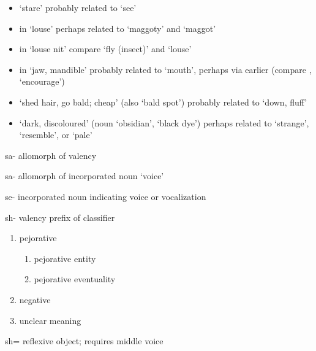 \begin{morphdesc}[resume*=alphalist]
\begin{enumerate}
\begin{itemize}
			(noun  ‘flab’)
			probably related to  ‘fat’ (noun  ‘fat’),
			compare  ‘fat (nonhuman)’,
			 ‘dog salmon’
		\item	{} ‘stare’
			probably related to  ‘see’
		\item	{} in  ‘louse’
			perhaps related to  ‘maggoty’
			and  ‘maggot’
		\item	{} in  ‘louse nit’
			compare  ‘fly (insect)’ and  ‘louse’
		\item	{} in  ‘jaw, mandible’
			probably related to  ‘mouth’, perhaps via earlier 
			(compare ,  ‘encourage’)
		\item	{} ‘shed hair, go bald; cheap’
			(also  ‘bald spot’)
			probably related to  ‘down, fluff’
		\item	{} ‘dark, discoloured’
			(noun  ‘obsidian’,  ‘black dye’)
			perhaps related to  ‘strange’,
			 ‘resemble’,
			or  ‘pale’
		\end{itemize}
	\end{enumerate}


\item[sa-]\label{m:sa-val}
	allomorph of valency 

\item[sa-]\label{m:sa-voice}
	allomorph of incorporated noun  ‘voice’

\item[se-]\label{m:se-}
	incorporated noun indicating voice or vocalization

\item[sh-]\label{m:sh-}
	valency prefix of classifier
	\begin{enumerate}
	\item	pejorative
		\begin{enumerate}
		\item	pejorative entity
		\item	pejorative eventuality
		\end{enumerate}
	\item	negative
	\item	unclear meaning
	\end{enumerate}

\item[sh=]\label{m:sh=}
	reflexive object;
	requires middle voice 


\end{morphdesc}
